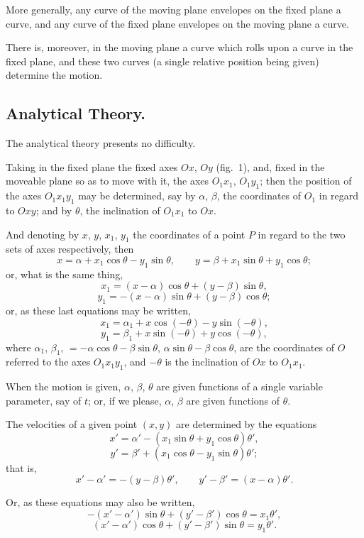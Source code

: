 \documentclass[11pt,a4paper]{book}
\begin{document}
More generally, any curve of the moving plane envelopes on the fixed
plane a curve, and any curve of the fixed plane envelopes on the moving
plane a curve.

There is, moreover, in the moving plane a curve which rolls upon a
curve in the fixed plane, and these two curves (a single relative position
being given) determine the motion.

\subsection*{Analytical Theory.}

The analytical theory presents no difficulty.

Taking in the fixed plane the fixed axes $Ox$, $Oy$ (fig.~1), and, fixed
in the moveable plane so as to move with it, the axes $O_1x_1$, $O_1y_1$;
then the position of the axes $O_1x_1y_1$ may be determined, say by
$\alpha$, $\beta$, the coordinates of $O_1$ in regard to $Oxy$; and by $\theta$,
the inclination of $O_1x_1$ to $Ox$.

And denoting by $x$, $y$, $x_1$, $y_1$ the coordinates of a point $P$ in
regard to the two sets of axes respectively, then
\[
x = \alpha + x_1\cos\theta - y_1\sin\theta,\qquad
y = \beta + x_1\sin\theta + y_1\cos\theta;
\]
or, what is the same thing,
\[
x_1 = (x-\alpha)\cos\theta + (y-\beta)\sin\theta,
\]
\[
y_1 = -(x-\alpha)\sin\theta + (y-\beta)\cos\theta;
\]
or, as these last equations may be written,
\[
x_1 = \alpha_1 + x\cos(-\theta) - y\sin(-\theta),
\]
\[
y_1 = \beta_1 + x\sin(-\theta) + y\cos(-\theta),
\]
where $\alpha_1$, $\beta_1$, $=-\alpha\cos\theta-\beta\sin\theta$,
$\alpha\sin\theta-\beta\cos\theta$, are the coordinates of $O$ referred to
the axes $O_1x_1y_1$, and $-\theta$ is the inclination of $Ox$ to $O_1x_1$.

When the motion is given, $\alpha$, $\beta$, $\theta$ are given functions of a single
variable parameter, say of $t$; or, if we please, $\alpha$, $\beta$ are given functions
of $\theta$.

The velocities of a given point $(x,y)$ are determined by the equations
\[
x' = \alpha' - (x_1\sin\theta + y_1\cos\theta)\theta',
\]
\[
y' = \beta' + (x_1\cos\theta - y_1\sin\theta)\theta';
\]
that is,
\[
x'-\alpha' = -(y-\beta)\theta',\qquad y'-\beta' = (x-\alpha)\theta'.
\]

Or, as these equations may also be written,
\[
-(x'-\alpha')\sin\theta + (y'-\beta')\cos\theta = x_1\theta',
\]
\[
(x'-\alpha')\cos\theta + (y'-\beta')\sin\theta = y_1\theta'.
\]
\end{document}
